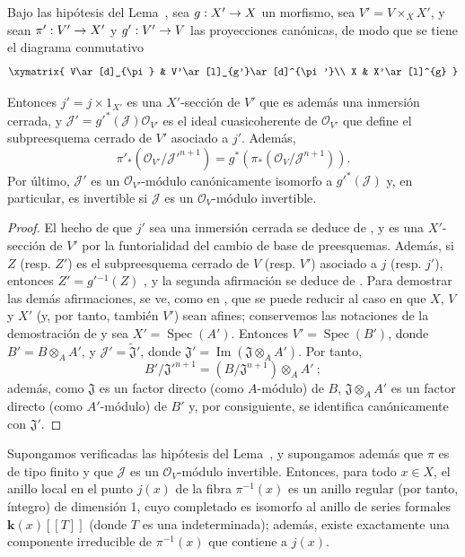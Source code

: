 \documentclass[oneside,10pt]{amsart}
\makeatletter
\newcommand{\ega@arrow}[2]{\mathchoice{#1}{#2}{#2}{#2}}
\renewcommand{\to}{\ega@arrow{\longrightarrow}{\rightarrow}}
\newcommand{\oldpage}[2][]{\marginnote{\normalfont\footnotesize\textbf{#1}~|~#2}\ignorespaces}
\let\EGAOriginalLabel\label
\renewcommand{\label}[1]{\phantomsection\EGAOriginalLabel{#1}}
\makeatother
\begin{document}
\begin{lemma}[8.10.2]
\label{II.8.10.2-fr}
Bajo las hipótesis del Lema~, sea $g:X'\to X$ un morfismo,
\oldpage[II]{186}
sea $V'=V\times_X X'$, y sean $\pi':V'\to X'$ y $g':V'\to V$ las proyecciones canónicas, de modo que se tiene el diagrama conmutativo
\[
  \xymatrix{
    V\ar[d]_{\pi} & V'\ar[l]_{g'}\ar[d]^{\pi'}\\
    X & X'\ar[l]^{g}
  }
\]

Entonces $j'=j\times1_{X'}$ es una $X'$-sección de $V'$ que es además una inmersión cerrada, y $\mathcal{J}'=g'^*(\mathcal{J})\mathcal{O}_{V'}$ es el ideal cuasicoherente de $\mathcal{O}_{V'}$ que define el subpreesquema cerrado de $V'$ asociado a $j'$.
Además,
\[
  \pi'_*(\mathcal{O}_{V'}/\mathcal{J}'^{n+1})
  =g^*(\pi_*(\mathcal{O}_V/\mathcal{J}^{n+1})).
\]
Por último, $\mathcal{J}'$ es un $\mathcal{O}_{V'}$-módulo canónicamente isomorfo a $g'^*(\mathcal{J})$ y, en particular, es invertible si $\mathcal{J}$ es un $\mathcal{O}_V$-módulo invertible.
\end{lemma}

\begin{proof}
El hecho de que $j'$ sea una inmersión cerrada se deduce de , y es una $X'$-sección de $V'$ por la funtorialidad del cambio de base de preesquemas.
Además, si $Z$ (resp. $Z'$) es el subpreesquema cerrado de $V$ (resp. $V'$) asociado a $j$ (resp. $j'$), entonces $Z'=g'{}^{-1}(Z)$ , y la segunda afirmación se deduce de .
Para demostrar las demás afirmaciones, se ve, como en , que se puede reducir al caso en que $X$, $V$ y $X'$ (y, por tanto, también $V'$) sean afines;
conservemos las notaciones de la demostración de  y sea $X'=\operatorname{Spec}(A')$.
Entonces $V'=\operatorname{Spec}(B')$, donde $B'=B\otimes_A A'$, y $\mathcal{J}'=\widetilde{\mathfrak{J}}'$, donde $\mathfrak{J}'=\operatorname{Im}(\mathfrak{J}\otimes_A A')$.
Por tanto,
\[
  B'/\mathfrak{J}'^{n+1}=(B/\mathfrak{J}^{n+1})\otimes_A A'~;
\]
además, como $\mathfrak{J}$ es un factor directo (como $A$-módulo) de $B$, $\mathfrak{J}\otimes_A A'$ es un factor directo (como $A'$-módulo) de $B'$ y, por consiguiente, se identifica canónicamente con $\mathfrak{J}'$.
\end{proof}

\begin{corollary}[8.10.3]
\label{II.8.10.3-fr}
Supongamos verificadas las hipótesis del Lema~, y supongamos además que $\pi$ es de tipo finito y que $\mathcal{J}$ es un $\mathcal{O}_V$-módulo invertible.
Entonces, para todo $x\in X$, el anillo local en el punto $j(x)$ de la fibra $\pi^{-1}(x)$ es un anillo regular (por tanto, íntegro) de dimensión 1, cuyo completado es isomorfo al anillo de series formales $\boldsymbol{k}(x)[[T]]$ (donde $T$ es una indeterminada);
además, existe exactamente una componente irreducible de $\pi^{-1}(x)$ que contiene a $j(x)$.
\end{corollary}
\end{document}
